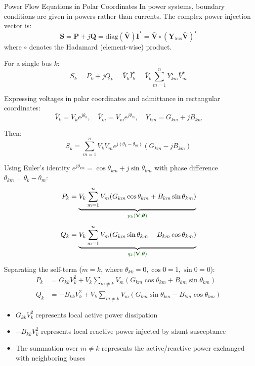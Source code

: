 \begin{frame}[allowframebreaks]{Power Flow Equations in Polar Coordinates}
    In power systems, boundary conditions are given in powers rather than currents.
    The complex power injection vector is:
    \begin{equation}
        \mathbf{S} = \mathbf{P} + j \mathbf{Q} = \mathrm{diag}(\mathbf{\bar{V}}) \mathbf{\bar{I}}^{\star} = \mathbf{\bar{V}} \circ (\mathbf{Y}_{\text{bus}} \mathbf{\bar{V}})^{\star} \label{eq:pf}
    \end{equation}
    where $\circ$ denotes the Hadamard (element-wise) product.
    
    For a single bus $k$:
    \begin{equation}
        S_k = P_k + j Q_k = \bar{V}_k \bar{I}_k^{\star} = \bar{V}_k \sum_{m=1}^n Y_{km}^{\star} \bar{V}_m^{\star}
    \end{equation}

    \newpage
    Expressing voltages in polar coordinates and admittance in rectangular coordinates:
    $$\bar{V}_k = V_k e^{j\theta_k}, \quad \bar{V}_m = V_m e^{j\theta_m}, \quad Y_{km} = G_{km} + j B_{km}$$
    
    Then:
    $$S_k = \sum_{m=1}^n V_k V_m e^{j(\theta_k - \theta_m)} (G_{km} - j B_{km})$$
    
    Using Euler's identity $e^{j\theta_{km}} = \cos\theta_{km} + j \sin\theta_{km}$ with phase difference $\theta_{km} = \theta_k - \theta_m$:
    \begin{align}
        P_k &= \underbrace{V_k \sum_{m=1}^n V_m (G_{km} \cos\theta_{km} + B_{km} \sin\theta_{km})}_{\mathcolor[RGB]{00,99,00}{p_k(\mathbf{V}, \boldsymbol{\theta})}}\label{eq:pf_P} \\[0.5em]
        Q_k &= \underbrace{V_k \sum_{m=1}^n V_m (G_{km} \sin\theta_{km} - B_{km} \cos\theta_{km})}_{\mathcolor[RGB]{00,99,00}{q_k(\mathbf{V}, \boldsymbol{\theta})}}\label{eq:pf_Q}
    \end{align}

    \newpage
    Separating the self-term ($m=k$, where $\theta_{kk}=0, \cos 0 = 1, \sin 0 = 0$):
    \begin{align}
        P_k &= G_{kk} V_k^2 + V_k \sum_{m \neq k} V_m (G_{km} \cos\theta_{km} + B_{km} \sin\theta_{km}) \\[0.5em]
        Q_k &= -B_{kk} V_k^2 + V_k \sum_{m \neq k} V_m (G_{km} \sin\theta_{km} - B_{km} \cos\theta_{km})
    \end{align}
    
    \begin{itemize}
        \item $G_{kk} V_k^2$ represents local active power dissipation
        \item $-B_{kk} V_k^2$ represents local reactive power injected by shunt susceptance
        \item The summation over $m \neq k$ represents the active/reactive power exchanged with neighboring buses
    \end{itemize}
\end{frame}

